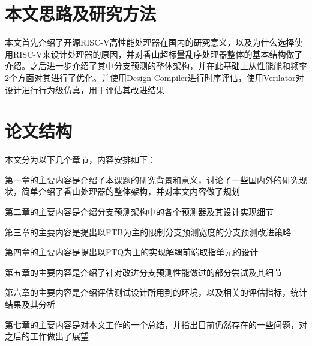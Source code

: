 
\section{本文思路及研究方法}

本文首先介绍了开源RISC-V高性能处理器在国内的研究意义，以及为什么选择使用RISC-V来设计处理器的原因，并对香山超标量乱序处理器整体的基本结构做了介绍。之后进一步介绍了其中分支预测的整体架构，并在此基础上从性能能和频率2个方面对其进行了优化。并使用Design Compiler进行时序评估，使用Verilator对设计进行行为级仿真，用于评估其改进结果

\section{论文结构}

本文分为以下几个章节，内容安排如下：

第一章的主要内容是介绍了本课题的研究背景和意义，讨论了一些国内外的研究现状，简单介绍了香山处理器的整体架构，并对本文内容做了规划

第二章的主要内容是介绍分支预测架构中的各个预测器及其设计实现细节

第三章的主要内容是提出以FTB为主的限制分支预测宽度的分支预测改进策略

第四章的主要内容是提出以FTQ为主的实现解耦前端取指单元的设计

第五章的主要内容是介绍了针对改进分支预测性能做过的部分尝试及其细节

第六章的主要内容是介绍评估测试设计所用到的环境，以及相关的评估指标，统计结果及其分析

第七章的主要内容是对本文工作的一个总结，并指出目前仍然存在的一些问题，对之后的工作做出了展望

